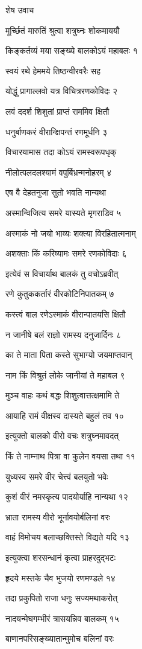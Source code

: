 
शेष उवाच

मूर्च्छितं मारुतिं श्रुत्वा शत्रुघ्नः शोकमाययौ

किङ्कर्तव्यं मया सङ्ख्ये बालकोऽयं महाबलः १

स्वयं रथे हेममये तिष्ठन्वीरवरैः सह

योद्धुं प्रागाल्लवो यत्र विचित्ररणकोविदः २

लवं ददर्श शिशुतां प्राप्तं राममिव क्षितौ

धनुर्बाणकरं वीरान्क्षिपन्तं रणमूर्धनि ३

विचारयामास तदा कोऽयं रामस्वरूपधृक्

नीलोत्पलदलश्यामं वपुर्बिभ्रन्मनोहरम् ४

एष वै देहतनुजा सुतो भवति नान्यथा

अस्मान्विजित्य समरे यास्यते मृगराडिव ५

अस्माकं नो जयो भाव्यः शक्त्या विरहितात्मनाम्

अशक्ताः किं करिष्यामः समरे रणकोविदाः ६

इत्येवं स विचार्याथ बालकं तु वचोऽब्रवीत्

रणे कुतुककर्तारं वीरकोटिनिपातकम् ७

कस्त्वं बाल रणेऽस्माकं वीरान्पातयसि क्षितौ

न जानीषे बलं राज्ञो रामस्य दनुजार्दिनः ८

का ते माता पिता कस्ते सुभाग्यो जयमाप्तवान्

नाम किं विश्रुतं लोके जानीयां ते महाबल ९

मुञ्च वाहः कथं बद्धः शिशुत्वात्तत्क्षमामि ते

आयाहि रामं वीक्षस्व दास्यते बहुलं तव १०

इत्युक्तो बालको वीरो वचः शत्रुघ्नमावदत्

किं ते नाम्नाथ पित्रा वा कुलेन वयसा तथा ११

युध्यस्व समरे वीर चेत्त्वं बलयुतो भवेः

कुशं वीरं नमस्कृत्य पादयोर्याहि नान्यथा १२

भ्राता रामस्य वीरो भूर्नावयोर्बलिनां वरः

वाहं विमोचय बलाच्छक्तिस्ते विद्यते यदि १३

इत्युक्त्वा शरसन्धानं कृत्वा प्राहरदुद्भटः

हृदये मस्तके चैव भुजयो रणमण्डले १४

तदा प्रकुपितो राजा धनुः सज्यमथाकरोत्

नादयन्मेघगम्भीरं त्रासयन्निव बालकम् १५

बाणानपरिसङ्ख्यातान्मुमोच बलिनां वरः


